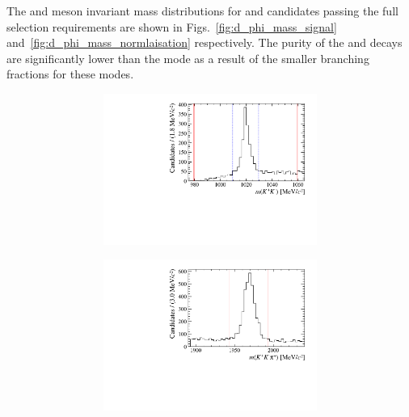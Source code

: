 The \Dsp and \phiz meson invariant mass distributions for \decay{\Bp}{\Dsp\phiz} and \decay{\Bp}{\Dsp\Dzb} candidates passing the full selection requirements are shown in Figs.~\ref{fig:d_phi_mass_signal} and~\ref{fig:d_phi_mass_normlaisation} respectively. 
The purity of the \decay{\Dsp}{\pip\pim\pip} and \decay{\Dsp}{\Kp\pim\pip} decays are significantly lower than the \decay{\Dsp}{\Kp\Km\pip} mode as a result of the smaller branching fractions for these modes. 


\begin{figure}[!h]
   \centering
   \begin{subfigure}[t]{1.0\textwidth}
   \centering
     \begin{subfigure}[t]{0.35\textwidth}
        \centering
        \includegraphics[width=1.0\textwidth]{figs/Selection/Phimass_KKPi_B2DsPhi.pdf}
     \end{subfigure}
     \begin{subfigure}[t]{0.35\textwidth}
        \centering
        \includegraphics[width=1.0\textwidth]{figs/Selection/Dmass_KKPi_B2DsPhi.pdf}

\end{subfigure}
\end{subfigure}
\end{figure}
